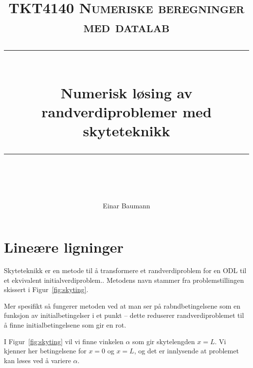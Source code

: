 


\usepackage{url}

\usepackage{etex}
\usepackage{tikz,pgfplots}
\pgfplotsset{compat=1.9}
\usetikzlibrary{arrows,decorations.markings}

\usepackage{import}


\author{Einar Baumann}
\title{
    \vspace{-1in}
    \normalfont \normalsize \textsc{TKT4140 Numeriske beregninger med datalab} \\ [20pt]
    \vspace{0.1in}
    \rule{\textwidth}{0.5pt} \\[1cm]
    {\sffamily \huge Numerisk løsing av randverdiproblemer med skyteteknikk} \\
    \vspace{0.1in}
    \rule{\textwidth}{2pt} \\[0.7cm]
}


\maketitle
\thispagestyle{empty}
\clearpage

\section{Lineære ligninger} %
\label{sec:line_re_ligninger}
Skyteteknikk er en metode til å transformere et randverdiproblem for en ODL til et ekvivalent initialverdiproblem.\cite{komp}. Metodens navn stammer fra problemstillingen skissert i Figur~\ref{fig:skyting}.

Mer spesifikt så fungerer metoden ved at man ser på rabndbetingelsene som en funksjon av initialbetingelser i et punkt -- dette reduserer randverdiproblemet til å finne initialbetingelsene som gir en rot.

I Figur~\ref{fig:skyting} vil vi finne vinkelen $\alpha$ som gir skytelengden $x=L$. Vi kjenner her betingelsene for $x=0$ og $x=L$, og det er innlysende at problemet kan løses ved å variere $\alpha$.

